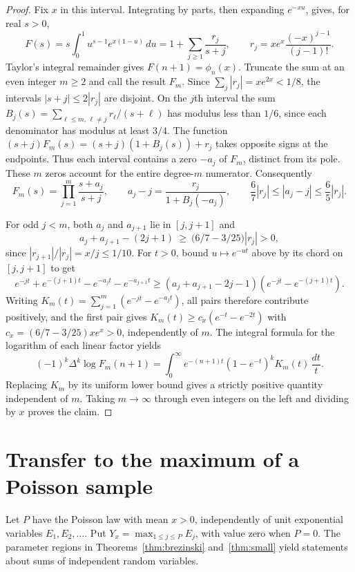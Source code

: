 \documentclass[11pt,a4paper]{article}
\begin{document}
\begin{proof}
Fix $x$ in this interval. Integrating by parts, then expanding $e^{-xu}$,
gives, for real $s>0$,
\[
 F(s)=s\int_0^1 u^{s-1}e^{x(1-u)}\,du
     =1+\sum_{j\ge1}\frac{r_j}{s+j},\qquad
 r_j=xe^x\frac{(-x)^{j-1}}{(j-1)!}.
\]
Taylor's integral remainder gives $F(n+1)=\phi_n(x)$. Truncate the sum
at an even integer $m\ge2$ and call the result $F_m$. Since
$\sum_j |r_j|=xe^{2x}<1/8$, the intervals $|s+j|\le2|r_j|$ are
disjoint. On the $j$th interval the sum
$B_j(s)=\sum_{\ell\le m,\,\ell\ne j}r_\ell/(s+\ell)$ has modulus
less than $1/6$, since each denominator has modulus at least $3/4$.
The function $(s+j)F_m(s)=(s+j)(1+B_j(s))+r_j$ takes opposite
signs at the endpoints. Thus each interval contains a zero $-a_j$
of $F_m$, distinct from its pole. These $m$ zeros account for the
entire degree-$m$ numerator. Consequently
\[
 F_m(s)=\prod_{j=1}^m\frac{s+a_j}{s+j},\qquad
 a_j-j=\frac{r_j}{1+B_j(-a_j)},\qquad
 \frac67|r_j|\le |a_j-j|\le\frac65|r_j|.
\]

For odd $j<m$, both $a_j$ and $a_{j+1}$ lie in $[j,j+1]$ and
\[
 a_j+a_{j+1}-(2j+1)
 \ \ge\ \bigl(6/7-3/25\bigr)|r_j|>0,
\]
since $|r_{j+1}|/|r_j|=x/j\le1/10$. For $t>0$, bound
$u\mapsto e^{-ut}$ above by its chord on $[j,j+1]$ to get
\[
 e^{-jt}+e^{-(j+1)t}-e^{-a_jt}-e^{-a_{j+1}t}
 \ge (a_j+a_{j+1}-2j-1)(e^{-jt}-e^{-(j+1)t}).
\]
Writing $K_m(t)=\sum_{j=1}^m(e^{-jt}-e^{-a_jt})$, all pairs
therefore contribute positively, and the first pair gives
$K_m(t)\ge c_x(e^{-t}-e^{-2t})$ with
$c_x=(6/7-3/25)xe^x>0$, independently of $m$.
The integral formula for the logarithm of each linear factor yields
\[
 (-1)^k\Delta^k\log F_m(n+1)
 =\int_0^\infty e^{-(n+1)t}(1-e^{-t})^k K_m(t)\,\frac{dt}{t}.
\]
Replacing $K_m$ by its uniform lower bound gives a strictly positive
quantity independent of $m$. Taking $m\to\infty$ through even integers
on the left and dividing by $x$ proves the claim.
\end{proof}

\section{Transfer to the maximum of a Poisson sample}
Let $P$ have the Poisson law with mean $x>0$, independently of unit exponential variables $E_1,E_2,\ldots$. Put $Y_x=\max_{1\le j\le P}E_j$, with value zero when $P=0$. The parameter regions in Theorems~\ref{thm:brezinski} and~\ref{thm:small} yield statements about sums of independent random variables.
\end{document}

